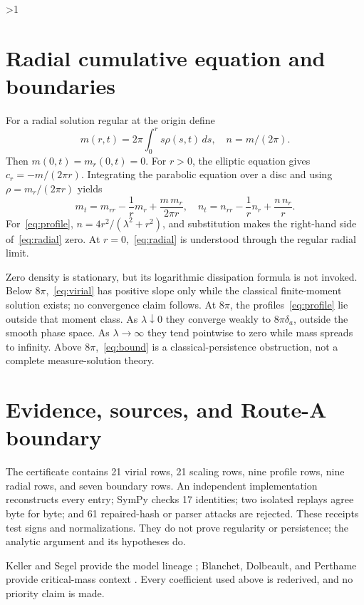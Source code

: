 \documentclass[10pt]{article}
\providecommand{\CRevisionRound}{2}
\begin{document}
\ifnum\CRevisionRound>1
\section{Radial cumulative equation and boundaries}

For a radial solution regular at the origin define
\begin{equation}
 m(r,t)=2\pi\int_0^r s\rho(s,t)\,ds,\quad n=m/(2\pi).
\end{equation}
Then $m(0,t)=m_r(0,t)=0$.  For $r>0$, the elliptic equation gives
$c_r=-m/(2\pi r)$.  Integrating the parabolic equation over a disc and using
$\rho=m_r/(2\pi r)$ yields
\begin{equation}
 m_t=m_{rr}-\frac1r m_r+\frac{m\,m_r}{2\pi r},
 \quad n_t=n_{rr}-\frac1r n_r+\frac{n\,n_r}{r}.      \label{eq:radial}
\end{equation}
For~\eqref{eq:profile}, $n=4r^2/(\lambda^2+r^2)$, and substitution makes the
right-hand side of~\eqref{eq:radial} zero.  At $r=0$,~\eqref{eq:radial} is
understood through the regular radial limit.

Zero density is stationary, but its logarithmic dissipation formula is not
invoked.  Below $8\pi$,~\eqref{eq:virial} has positive slope only while
the classical finite-moment solution exists; no convergence claim follows.
At $8\pi$, the profiles~\eqref{eq:profile} lie outside that moment class.  As
$\lambda\downarrow0$ they converge weakly to $8\pi\delta_a$, outside the
smooth phase space.  As $\lambda\to\infty$ they tend pointwise to zero while
mass spreads to infinity.  Above $8\pi$,~\eqref{eq:bound} is a classical-persistence
obstruction, not a complete measure-solution theory.

\section{Evidence, sources, and Route-A boundary}

The certificate contains 21 virial rows, 21 scaling rows, nine profile rows,
nine radial rows, and seven boundary rows.  An independent implementation
reconstructs every entry; SymPy checks 17 identities; two isolated replays
agree byte for byte; and 61 repaired-hash or parser attacks are rejected.
These receipts test signs and normalizations.  They do not prove regularity
or persistence; the analytic argument and its hypotheses do.

Keller and Segel provide the model lineage \cite{kellersegel}; Blanchet,
Dolbeault, and Perthame provide critical-mass context \cite{blanchet}.  Every
coefficient used above is rederived, and no priority claim is made.
\end{document}
